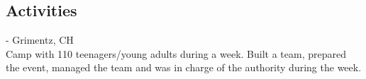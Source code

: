 \documentclass[mm, 11pt]{simple_style}
\begin{document}
\begin{resume}
\sectionline

\section{Activities}
 - Grimentz, CH \\
Camp with 110 teenagers/young adults during a week. Built a team, prepared the event, managed the team and was in charge of the authority during the week.\\
\end{resume}
\end{document}
